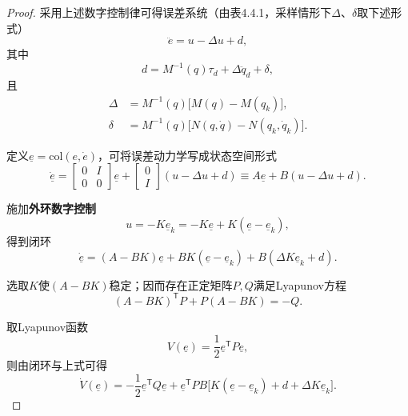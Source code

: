 \documentclass[UTF8]{ctexart}
\theoremstyle{definition}
\begin{document}
\begin{proof}
采用上述数字控制律可得误差系统（由表4.4.1，采样情形下$\Delta$、$\delta$取下述形式）
\begin{equation*}
    \ddot{e} = u - \Delta u + d,
\end{equation*}
其中
\begin{equation*}
    d = M^{-1}(q)\tau_d + \Delta \ddot{q}_d + \delta,
\end{equation*}
且
\begin{equation*}
\begin{aligned}
    \Delta &= M^{-1}(q)\bigl[M(q)-M(q_k)\bigr], \\
    \delta &= M^{-1}(q)\bigl[N(q,\dot{q})-N(q_k,\dot{q}_k)\bigr].
\end{aligned}
\end{equation*}

定义$\underline{e}=\mathrm{col}(e,\dot{e})$，可将误差动力学写成状态空间形式
\begin{equation*}
    \underline{\dot{e}} = \begin{bmatrix} 0 & I \\ 0 & 0 \end{bmatrix}\underline{e} + \begin{bmatrix} 0 \\ I \end{bmatrix}(u-\Delta u+d) \equiv A\underline{e}+B(u-\Delta u+d).
\end{equation*}

施加\textbf{外环数字控制}
\begin{equation*}
    u=-K\underline{e}_k=-K\underline{e}+K(\underline{e}-\underline{e}_k),
\end{equation*}
得到闭环
\begin{equation*}
    \underline{\dot{e}}=(A-BK)\underline{e}+BK(\underline{e}-\underline{e}_k)+B(\Delta K\underline{e}_k+d).
\end{equation*}

选取$K$使$(A-BK)$稳定；因而存在正定矩阵$P,Q$满足Lyapunov方程
\begin{equation*}
    (A-BK)^{\mathsf{T}}P+P(A-BK)=-Q.
\end{equation*}

取Lyapunov函数
\begin{equation*}
    V(\underline{e})=\frac{1}{2}\underline{e}^{\mathsf{T}}P\underline{e},
\end{equation*}
则由闭环与上式可得
\begin{equation*}
    \dot{V}(\underline{e})=-\frac{1}{2}\underline{e}^{\mathsf{T}}Q\underline{e}+\underline{e}^{\mathsf{T}}PB\bigl[K(\underline{e}-\underline{e}_k)+d+\Delta K\underline{e}_k\bigr].
\end{equation*}


\end{proof}
\end{document}
